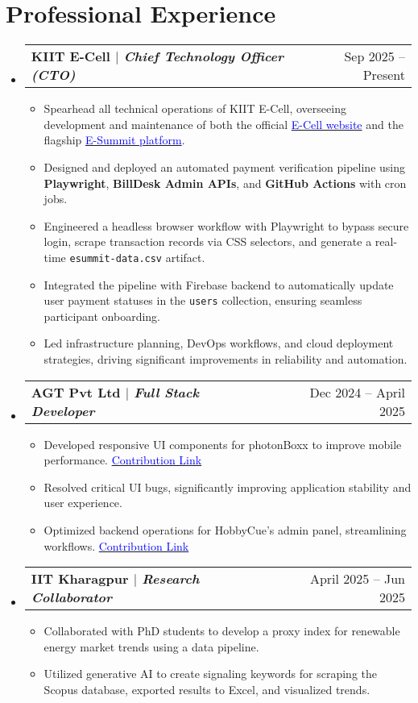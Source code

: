 \documentclass[letterpaper,11pt]{article}
\makeatletter
\newcommand{\resumeItem}[1]{\item\small{#1 \vspace{-3pt}}}
\newcommand{\resumeProjectHeading}[2]{
  \item
  \begin{tabular*}{0.98\textwidth}{l@{\extracolsep{\fill}}r}
    \small\bfseries#1 & \small#2 \\
  \end{tabular*}\vspace{-6pt}
}
\newcommand{\resumeSubHeadingListStart}{\begin{itemize}[leftmargin=0.1in, label={}]}
\newcommand{\resumeSubHeadingListEnd}{\end{itemize}\vspace{-6pt}}
\newcommand{\resumeItemListStart}{\begin{itemize}}
\newcommand{\resumeItemListEnd}{\end{itemize}\vspace{-6pt}}
\makeatother
\begin{document}
\section{Professional Experience}
\vspace{2pt}
\resumeSubHeadingListStart
  \resumeProjectHeading{\textbf{KIIT E-Cell} $|$ \emph{Chief Technology Officer (CTO)}}{Sep 2025 -- Present}
  \resumeItemListStart
    \resumeItem{Spearhead all technical operations of KIIT E-Cell, overseeing development and maintenance of both the official \href{https://kiitecell.org/}{\textcolor{blue}{E-Cell website}} and the flagship \href{https://esummit.kiitecell.org/}{\textcolor{blue}{E-Summit platform}}.}
    \resumeItem{Designed and deployed an automated payment verification pipeline using \textbf{Playwright}, \textbf{BillDesk Admin APIs}, and \textbf{GitHub Actions} with cron jobs.}
    \resumeItem{Engineered a headless browser workflow with Playwright to bypass secure login, scrape transaction records via CSS selectors, and generate a real-time \texttt{esummit-data.csv} artifact.}
    \resumeItem{Integrated the pipeline with Firebase backend to automatically update user payment statuses in the \texttt{users} collection, ensuring seamless participant onboarding.}
    \resumeItem{Led infrastructure planning, DevOps workflows, and cloud deployment strategies, driving significant improvements in reliability and automation.}
  \resumeItemListEnd

  \resumeProjectHeading{\textbf{AGT Pvt Ltd} $|$ \emph{Full Stack Developer}}{Dec 2024 -- April 2025}
  \resumeItemListStart
    \resumeItem{Developed responsive UI components for photonBoxx to improve mobile performance. \href{https://sujays-organization-1.gitbook.io/photonboxx-contribution/}{\textcolor{blue}{Contribution Link}}}
    \resumeItem{Resolved critical UI bugs, significantly improving application stability and user experience.}
    \resumeItem{Optimized backend operations for HobbyCue's admin panel, streamlining workflows. \href{https://sujays-organization-1.gitbook.io/untitled/}{\textcolor{blue}{Contribution Link}}}
  \resumeItemListEnd

  \resumeProjectHeading{\textbf{IIT Kharagpur} $|$ \emph{Research Collaborator}}{April 2025 -- Jun 2025}
  \resumeItemListStart
    \resumeItem{Collaborated with PhD students to develop a proxy index for renewable energy market trends using a data pipeline.}
    \resumeItem{Utilized generative AI to create signaling keywords for scraping the Scopus database, exported results to Excel, and visualized trends.}
  \resumeItemListEnd
\resumeSubHeadingListEnd
\end{document}
